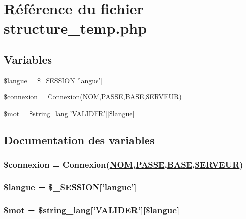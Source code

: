 \hypertarget{structure__temp_8php}{
\section{R\'{e}f\'{e}rence du fichier structure\_\-temp.php}
\label{structure__temp_8php}
}
\subsection*{Variables}
\begin{CompactItemize}
\item 
\hyperlink{structure__temp_8php_a0}{\$langue} = \$\_\-SESSION\mbox{[}'langue'\mbox{]}
\item 
\hyperlink{structure__temp_8php_a1}{\$connexion} = Connexion(\hyperlink{pma__connect_8php_a0}{NOM},\hyperlink{pma__connect_8php_a1}{PASSE},\hyperlink{pma__connect_8php_a3}{BASE},\hyperlink{pma__connect_8php_a2}{SERVEUR})
\item 
\hyperlink{structure__temp_8php_a2}{\$mot} = \$string\_\-lang\mbox{[}'VALIDER'\mbox{]}\mbox{[}\$langue\mbox{]}
\end{CompactItemize}


\subsection{Documentation des variables}
\hypertarget{structure__temp_8php_a1}{
\subsubsection[\$connexion]{\setlength{\rightskip}{0pt plus 5cm}\$connexion = Connexion(\hyperlink{pma__connect_8php_a0}{NOM},\hyperlink{pma__connect_8php_a1}{PASSE},\hyperlink{pma__connect_8php_a3}{BASE},\hyperlink{pma__connect_8php_a2}{SERVEUR})}}
\label{structure__temp_8php_a1}


\hypertarget{structure__temp_8php_a0}{
\subsubsection[\$langue]{\setlength{\rightskip}{0pt plus 5cm}\$langue = \$\_\-SESSION\mbox{[}'langue'\mbox{]}}}
\label{structure__temp_8php_a0}


\hypertarget{structure__temp_8php_a2}{
\subsubsection[\$mot]{\setlength{\rightskip}{0pt plus 5cm}\$mot = \$string\_\-lang\mbox{[}'VALIDER'\mbox{]}\mbox{[}\$langue\mbox{]}}}
\label{structure__temp_8php_a2}


